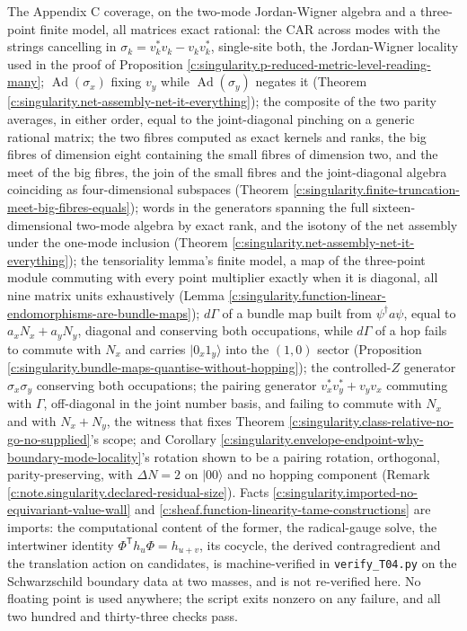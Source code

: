\documentclass[11pt]{article}
\theoremstyle{definition}
\theoremstyle{plain}
\begin{document}
The Appendix C coverage, on the two-mode Jordan-Wigner algebra and a three-point finite model, all matrices exact rational: the CAR across modes with the strings cancelling in $\sigma_k = v_k^{*}v_k - v_kv_k^{*}$, single-site both, the Jordan-Wigner locality used in the proof of Proposition \ref{c:singularity.p-reduced-metric-level-reading-many}; $\operatorname{Ad}(\sigma_x)$ fixing $v_y$ while $\operatorname{Ad}(\sigma_y)$ negates it (Theorem \ref{c:singularity.net-assembly-net-it-everything}); the composite of the two parity averages, in either order, equal to the joint-diagonal pinching on a generic rational matrix; the two fibres computed as exact kernels and ranks, the big fibres of dimension eight containing the small fibres of dimension two, and the meet of the big fibres, the join of the small fibres and the joint-diagonal algebra coinciding as four-dimensional subspaces (Theorem \ref{c:singularity.finite-truncation-meet-big-fibres-equals}); words in the generators spanning the full sixteen-dimensional two-mode algebra by exact rank, and the isotony of the net assembly under the one-mode inclusion (Theorem \ref{c:singularity.net-assembly-net-it-everything}); the tensoriality lemma's finite model, a map of the three-point module commuting with every point multiplier exactly when it is diagonal, all nine matrix units exhaustively (Lemma \ref{c:singularity.function-linear-endomorphisms-are-bundle-maps}); $d\Gamma$ of a bundle map built from $\psi^{\dagger}a\psi$, equal to $a_xN_x + a_yN_y$, diagonal and conserving both occupations, while $d\Gamma$ of a hop fails to commute with $N_x$ and carries $|0_x 1_y\rangle$ into the $(1,0)$ sector (Proposition \ref{c:singularity.bundle-maps-quantise-without-hopping}); the controlled-$Z$ generator $\sigma_x\sigma_y$ conserving both occupations; the pairing generator $v^{*}_xv^{*}_y + v_yv_x$ commuting with $\Gamma$, off-diagonal in the joint number basis, and failing to commute with $N_x$ and with $N_x + N_y$, the witness that fixes Theorem \ref{c:singularity.class-relative-no-go-no-supplied}'s scope; and Corollary \ref{c:singularity.envelope-endpoint-why-boundary-mode-locality}'s rotation shown to be a pairing rotation, orthogonal, parity-preserving, with $\Delta N = 2$ on $|00\rangle$ and no hopping component (Remark \ref{c:note.singularity.declared-residual-size}). Facts \ref{c:singularity.imported-no-equivariant-value-wall} and \ref{c:sheaf.function-linearity-tame-constructions} are imports: the computational content of the former, the radical-gauge solve, the intertwiner identity $\Phi^{\mathsf T}h_u\Phi = h_{u+v}$, its cocycle, the derived contragredient and the translation action on candidates, is machine-verified in \texttt{verify\_T04.py} on the Schwarzschild boundary data at two masses, and is not re-verified here. No floating point is used anywhere; the script exits nonzero on any failure, and all two hundred and thirty-three checks pass.
\end{document}

